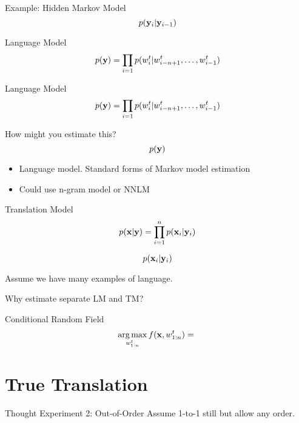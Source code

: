 \documentclass{beamer}
\begin{document}
\begin{frame}{Example: Hidden Markov Model}
  \[ p(\mathbf{y}_i | \mathbf{y}_{i-1}) \] 
\end{frame}

\begin{frame}{Language Model}
  \[ p(\mathbf{y}) = \prod_{i=1} p(w^{t}_i | w^{t}_{i-n+1}, \ldots, w^{t}_{i-1})  \] 
\end{frame}


\begin{frame}{Language Model}
  \[ p(\mathbf{y}) = \prod_{i=1} p(w^{t}_i | w^{t}_{i-n+1}, \ldots, w^{t}_{i-1})  \] 
\end{frame}


\begin{frame}{How might you estimate this?}  
  \[ p(\mathbf{y}) \]

  \begin{itemize}
  \item Language model. Standard forms of Markov model estimation
  \item Could use n-gram model or NNLM 
  \end{itemize}
\end{frame}

\begin{frame}{Translation Model}
  \[ p(\mathbf{x} | \mathbf{y})  = \prod_{i=1}^n p(\mathbf{x}_i | \mathbf{y}_i )  \]


  \[ p(\mathbf{x}_i | \mathbf{y}_i )\] 

  Assume we have many examples of language. 
  
  Why estimate separate LM and TM?
\end{frame}

\begin{frame}{Conditional Random Field}
  \[ \argmax_{w^t_{1:n}} f(\boldx, w^t_{1:n}) = \ \] 
\end{frame}


\section{True Translation}

\begin{frame}{Thought Experiment 2: Out-of-Order}
  Assume 1-to-1 still but allow any order. 
\end{frame}



\end{document}

